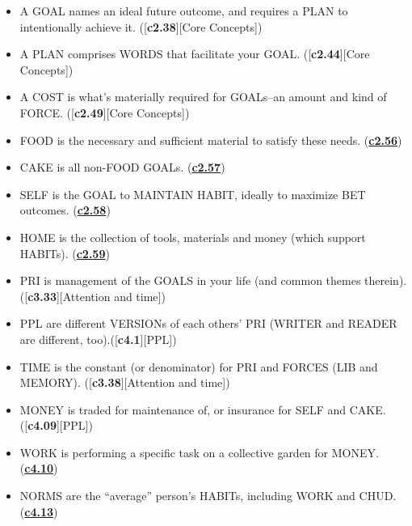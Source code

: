 \documentclass[
]{book}
\providecommand{\tightlist}{%
  \setlength{\itemsep}{0pt}\setlength{\parskip}{0pt}}
\begin{document}
\begin{itemize}
\tightlist
\item
  A GOAL names an ideal future outcome, and requires a PLAN to intentionally achieve it. ({[}\textbf{c2.38}{]}{[}Core Concepts{]})\\
\item
  A PLAN comprises WORDS that facilitate your GOAL. ({[}\textbf{c2.44}{]}{[}Core Concepts{]})\\
\item
  A COST is what's materially required for GOALs--an amount and kind of FORCE. ({[}\textbf{c2.49}{]}{[}Core Concepts{]})\\
\item
  FOOD is the necessary and sufficient material to satisfy these needs. (\hyperref[self]{\textbf{c2.56}})\\
\item
  CAKE is all non-FOOD GOALs. (\hyperref[self]{\textbf{c2.57}})\\
\item
  SELF is the GOAL to MAINTAIN HABIT, ideally to maximize BET outcomes. (\hyperref[self]{\textbf{c2.58}})\\
\item
  HOME is the collection of tools, materials and money (which support HABITs). (\hyperref[home]{\textbf{c2.59}})\\
\item
  PRI is management of the GOALS in your life (and common themes therein). ({[}\textbf{c3.33}{]}{[}Attention and time{]})\\
\item
  PPL are different VERSIONs of each others' PRI (WRITER and READER are different, too).({[}\textbf{c4.1}{]}{[}PPL{]})\\
\item
  TIME is the constant (or denominator) for PRI and FORCES (LIB and MEMORY). ({[}\textbf{c3.38}{]}{[}Attention and time{]})\\
\item
  MONEY is traded for maintenance of, or insurance for SELF and CAKE. ({[}\textbf{c4.09}{]}{[}PPL{]})\\
\item
  WORK is performing a specific task on a collective garden for MONEY. (\hyperref[work]{\textbf{c4.10}})\\
\item
  NORMS are the ``average'' person's HABITs, including WORK and CHUD. (\hyperref[work]{\textbf{c4.13}})\\

\end{itemize}
\end{document}
